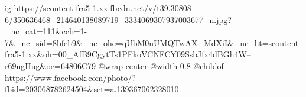  
 
 
 
 

\ifcmt
  ig https://scontent-fra5-1.xx.fbcdn.net/v/t39.30808-6/350636468_214640138089719_3334069307937003677_n.jpg?_nc_cat=111&ccb=1-7&_nc_sid=8bfeb9&_nc_ohc=qUbM0nUMQTwAX_MdXiI&_nc_ht=scontent-fra5-1.xx&oh=00_AfB9CgytTs1PFkoVCNFCY09SsbJfx4dBGh4W--r69ugHug&oe=64806C79
  @wrap center
  @width 0.8
  @childof https://www.facebook.com/photo/?fbid=203068782624504&set=a.139367062328010
\fi
